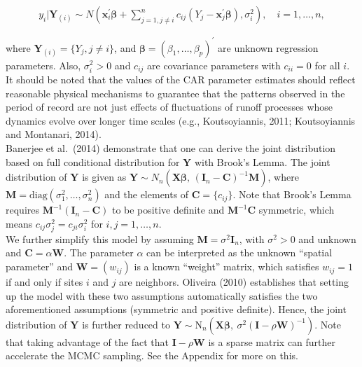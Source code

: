 \documentclass{svjour3}
\begin{document}
\begin{align*}
y_i|\mathbf Y_{(i)} \sim N \left( \mathbf x_i^{'}\boldsymbol{\beta} + \sum_{j=1, j\neq i}^n c_{ij}(Y_j - \mathbf x_j^{'} \boldsymbol{\beta}), \sigma_i^2\right), \quad i = 1, \ldots, n,
\end{align*}

\noindent where $\mathbf Y_{(i)} = \{ Y_{j}, j \neq i\}$, and  $\boldsymbol{\beta} = (\beta_1, \ldots, \beta_p)^{'}$  are unknown regression parameters.
Also, $ \sigma_i^2 > 0$ and $ c_{ij}$ are covariance parameters with $ c_{ii} = 0$ for all $ i$.
It should be noted that
 the values of the CAR parameter estimates should reflect reasonable physical mechanisms to guarantee that the patterns observed in the period of record are not just effects of fluctuations of runoff processes whose dynamics evolve over longer time scales (e.g., Koutsoyiannis, 2011;
 Koutsoyiannis and Montanari, 2014). \\

Banerjee et al.\ (2014) demonstrate that one can derive the joint distribution based on full conditional distribution for $ \mathbf Y $ with Brook's Lemma.
The joint distribution of $ \mathbf Y$ is given as $\mathbf Y \sim N_n(\mathbf X\boldsymbol{\beta}, \, (\mathbf I_n -\mathbf C)^{-1}\mathbf M)$, where  $\mathbf M = \text{diag}(\sigma_{1}^2, \ldots, \sigma^2_{n})$ and the elements of  $\mathbf C = \{ c_{ij} \}$.
Note that Brook's Lemma requires $\mathbf M^{-1}(\mathbf I_n - \mathbf C)$ to be  positive definite and $\mathbf M^{-1}\mathbf C$ symmetric, which means $ c_{ij}\sigma_j^2 = c_{ji}\sigma_i^2$ for $ i, j = 1, \ldots, n$. \\

We further simplify this model by assuming $\mathbf M = \sigma^2 \mathbf I_n$, with $ \sigma^2 > 0$  and unknown and $\mathbf C = \alpha \mathbf W$.
The parameter $ \alpha$ can be interpreted as the unknown ``spatial parameter'' and $\mathbf W = (w_{ij})$ is a known ``weight'' matrix, which satisfies $ w_{ij} =1$ if and only if sites $ i$ and $ j$ are neighbors.
Oliveira (2010) establishes that setting up the model with these two assumptions automatically satisfies the two aforementioned assumptions (symmetric and positive definite).
Hence, the joint distribution of $ \mathbf Y$ is further reduced to $ \mathbf Y \sim \text{N}_n(\mathbf  X\boldsymbol{\beta} , \ \sigma^2 (\mathbf I -  \rho \mathbf W)^{-1})$.
Note that taking advantage of the fact that $ \mathbf I - \rho \mathbf W$ is a sparse matrix can further accelerate the MCMC sampling.
See the Appendix for more on this.\\
\end{document}
